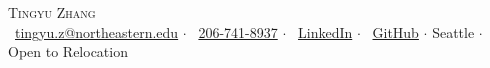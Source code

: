 \documentclass{resume}
\begin{document}
\begin{center}
    {\Huge \textsc{Tingyu Zhang}} \\[4pt]
    \faEnvelope\ \href{mailto:tingyu.z@northeastern.edu}{tingyu.z@northeastern.edu} $\cdot$
    \faPhone\ \href{tel:206-741-8937}{206-741-8937} $\cdot$
    \faLinkedin\ \href{https://www.linkedin.com/in/tingyu-zhang-424065388}{LinkedIn} $\cdot$
    \faGithub\ \href{https://github.com/Panreta}{GitHub} $\cdot$
    Seattle $\cdot$ Open to Relocation
\end{center}

\vspace{-12pt}

\vspace{-18pt}

\vspace{-18pt}

\vspace{-15pt}

\vspace{-18pt}
% 

\end{document}
